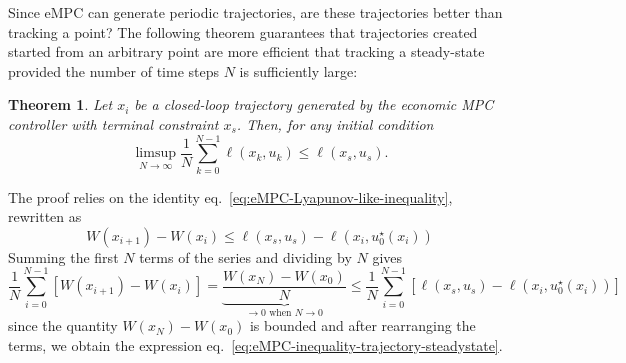 \documentclass[11pt]{report}
\newtheorem{theorem}{Theorem}
\begin{document}
Since eMPC can generate periodic trajectories, are these trajectories better than tracking a point? The following theorem guarantees that trajectories created started from an arbitrary point are more efficient that tracking a steady-state provided the number of time steps $N$ is sufficiently large:
\begin{theorem}
  Let $x_i$ be a closed-loop trajectory generated by the economic MPC controller with terminal constraint $x_s$. Then, for any initial condition
  \begin{equation}
    \label{eq:eMPC-inequality-trajectory-steadystate}
    \limsup_{N\rightarrow \infty} \frac{1}{N} \sum_{k=0}^{N-1} \ell(x_k,u_k) \le \ell(x_s,u_s).
  \end{equation}
\end{theorem}
The proof relies on the identity eq.~\eqref{eq:eMPC-Lyapunov-like-inequality}, rewritten as
\begin{equation*}
  W(x_{i+1}) - W(x_i) \le \ell(x_s,u_s) - \ell(x_i,u_0^\star(x_i))
\end{equation*}
Summing the first $N$ terms of the series and dividing by $N$ gives
\begin{equation*}
  \frac{1}{N}\sum_{i=0}^{N-1} \left[W(x_{i+1}) - W(x_i)\right] = \underbrace{\frac{W(x_N) - W(x_0)}{N}}_{\rightarrow 0 \text{ when } N\rightarrow 0} \le \frac{1}{N}\sum_{i=0}^{N-1}  \left[\ell(x_s,u_s) - \ell(x_i,u_0^\star(x_i))\right]
\end{equation*}
since the quantity $W(x_N) - W(x_0)$ is bounded and after rearranging the terms, we obtain the expression eq.~\eqref{eq:eMPC-inequality-trajectory-steadystate}.
\end{document}
